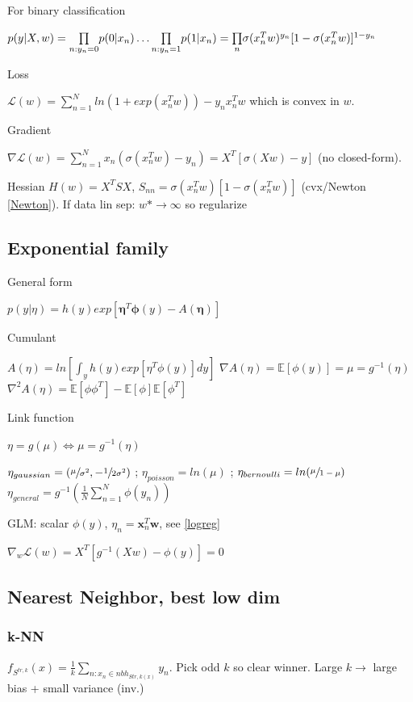 For binary classification

$p(y | X, w) = \underset{n:y_n=0}{\prod} p(0|x_n) \dots\underset{n:y_n=1}{\prod} p(1|x_n) \newline = \underset{n}{\prod} \sigma({x_n^T w})^{y_n}[1-\sigma({x_n^T w})]^{1-y_n}$

Loss

$\mathcal{L}(w) = \sum_{n=1}^N ln(1 + exp(x_n^T w)) - y_n x_n^T w$ which is convex in $w$.

Gradient

$\nabla \mathcal{L}(w) = \sum_{n=1}^N x_n (\sigma(x_n^T w) - y_n) = X^T[\sigma(Xw) - y]$ (no closed-form).

 Hessian $H(w) = X^T S X$, $S_{nn} = \sigma(x_n^T w)[1-\sigma(x_n^T w)]$ (cvx/Newton \ref{Newton}).
If data lin sep: $w*\rightarrow\infty$ so regularize
\subsection{Exponential family}
General form

$p(y|\eta) = h(y) exp[\boldsymbol{\eta}^T \boldsymbol{\phi}(y) - A(\boldsymbol{\eta})]$

Cumulant

$A(\eta) = ln[\int_y h(y) exp[\eta^T \phi(y)] dy]$
\newline
$\nabla A(\eta) = \mathbb{E}[\phi(y)] = \mu = g^{-1}(\eta)$
\newline
$\nabla^2 A(\eta) = \mathbb{E}[\phi\phi^T] - \mathbb{E}[\phi]\mathbb{E}[\phi^T]$

Link function

$\eta = g(\mu) \Leftrightarrow \mu = g^{-1}(\eta)$

$\eta_{gaussian} = (\sfrac{\mu}{\sigma^2}, -\sfrac{1}{2 \sigma^2})$
; $\eta_{poisson} = ln(\mu)$
; $\eta_{bernoulli} = ln(\sfrac{\mu}{1 - \mu})$
\newline $\eta_{general} = g^{-1}(\frac{1}{N} \sum_{n=1}^N \phi(y_n))$

GLM: scalar $\phi(y)$, $\eta_n=\boldsymbol{x}_n^T\boldsymbol{w}$, see \ref{logreg}

$\nabla_w \mathcal{L}(w)= X^T [g^{-1}(Xw)- \phi(y)]= 0$

\subsection{Nearest Neighbor, best low dim}
\subsubsection{k-NN}
$f_{S^{tr,k}}(x) = \frac{1}{k} \sum_{n:x_n\in nbh_{S{tr,k}(x)}} y_n$.
Pick odd $k$ so clear winner.
Large $k \rightarrow$ large bias + small variance (inv.)

